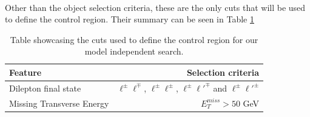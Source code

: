 \documentclass[12pt, a4paper]{book}
\begin{document}
\\Other than the object selection criteria, these are the only cuts that will be used to define the control region. Their summary can be seen in Table \ref{tab:CR_cuts}
\begin{table}[!h]
    \centering\caption[Control region for model-independent search]{Table showcasing the cuts used to define the control region for our model independent search.}
    \begin{tabular}{l|r}\midrule\midrule
        Feature                                                                 & Selection criteria        \\\midrule
        Dilepton final state                                                    & $\ell^\pm \ell^\mp$, $\ell^\pm \ell^\pm$, $\ell^\pm \ell'^\mp$ and $\ell^\pm \ell'^\pm$    \\
        Missing Transverse Energy                                               & $E_T^{miss} > 50$ GeV     \\\midrule\midrule
    \end{tabular}
    \label{tab:CR_cuts}
\end{table}
\end{document}
